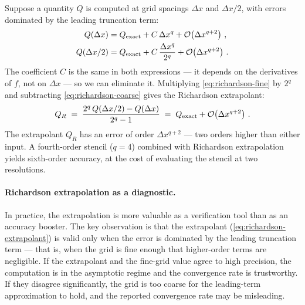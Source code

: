 Suppose a quantity $Q$ is computed at grid spacings $\Delta x$ and
$\Delta x/2$, with errors dominated by the leading truncation term:
%
\begin{align}
  Q(\Delta x)   &= Q_{\text{exact}} + C\,\Delta x^q
                   + \mathcal{O}\!\left(\Delta x^{q+2}\right) \,, \label{eq:richardson-coarse} \\
  Q(\Delta x/2) &= Q_{\text{exact}} + C\,\frac{\Delta x^q}{2^q}
                   + \mathcal{O}\!\left(\Delta x^{q+2}\right) \,.
                   \label{eq:richardson-fine}
\end{align}
%
The coefficient $C$ is the same in both expressions --- it depends on the
derivatives of $f$, not on $\Delta x$ --- so we can eliminate it.
Multiplying \cref{eq:richardson-fine} by $2^q$ and subtracting
\cref{eq:richardson-coarse} gives the Richardson extrapolant:
%
\begin{equation}
  Q_R \;=\; \frac{2^q\,Q(\Delta x/2) - Q(\Delta x)}{2^q - 1}
  \;=\; Q_{\text{exact}} + \mathcal{O}\!\left(\Delta x^{q+2}\right) \,.
  \label{eq:richardson-extrapolant}
\end{equation}
%
The extrapolant $Q_R$ has an error of order $\Delta x^{q+2}$ --- two
orders higher than either input.  A fourth-order stencil ($q = 4$)
combined with Richardson extrapolation yields sixth-order accuracy, at the
cost of evaluating the stencil at two resolutions.

\paragraph{Richardson extrapolation as a diagnostic.}

In practice, the extrapolation is more valuable as a verification
tool than as an accuracy booster.  The key observation is that the
extrapolant (\cref{eq:richardson-extrapolant}) is valid only when the
error is dominated by the leading truncation term --- that is, when the
grid is fine enough that higher-order terms are negligible.  If the
extrapolant and the fine-grid value agree to high precision, the
computation is in the asymptotic regime and the convergence rate is
trustworthy.  If they disagree significantly, the grid is too coarse for
the leading-term approximation to hold, and the reported convergence rate
may be misleading.

